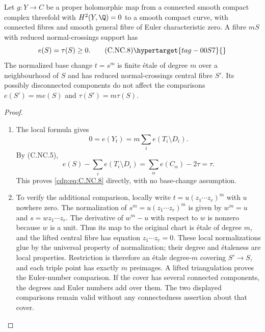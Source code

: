 \begin{proposition}\hypertarget{tag-01CA}{}\label{cdp:st:C.2.NC.3}

Let $g:Y\to C$ be a proper holomorphic map from a connected smooth compact complex threefold with $H^2(Y,\Q)=0$ to a smooth compact curve, with connected fibres and smooth general fibre of Euler characteristic zero. A fibre $mS$ with reduced normal-crossings support has
\[
 e(S)=\tau(S)\ge0.
 \tag{C.NC.8}\hypertarget{tag-00S7}{}\label{cdp:eq:C.NC.8}
\]
The normalized base change $t=s^m$ is finite étale of degree $m$ over a neighbourhood of $S$ and has reduced normal-crossings central fibre $S'$. Its possibly disconnected components do not affect the comparisons
$e(S')=m e(S)$ and $\tau(S')=m\tau(S)$.
\end{proposition}


\begin{proof}

\begin{enumerate}[label={$\langle1\rangle$\arabic*.},leftmargin=*]
\item The local formula  gives
\[
 0=e(Y_t)=m\sum_i e(T_i\setminus D_i).
\]
By (C.NC.5),
\[
 e(S)-\sum_i e(T_i\setminus D_i)
 =\sum_\alpha e(C_\alpha)-2\tau=\tau.
\]
This proves \eqref{cdp:eq:C.NC.8} directly, with no base-change assumption.

\item To verify the additional comparison, locally write $t=u(z_1\cdots z_r)^m$ with $u$ nowhere zero. The normalization of $s^m=u(z_1\cdots z_r)^m$ is given by
$w^m=u$ and $s=wz_1\cdots z_r$.
The derivative of $w^m-u$ with respect to $w$ is nonzero because $w$ is a unit. Thus its map to the original chart is étale of degree $m$, and the lifted central fibre has equation $z_1\cdots z_r=0$. These local normalizations glue by the universal property of normalization; their degree and étaleness are local properties. Restriction is therefore an étale degree-$m$ covering $S'\to S$, and each triple point has exactly $m$ preimages. A lifted triangulation proves the Euler-number comparison. If the cover has several connected components, the degrees and Euler numbers add over them. The two displayed comparisons remain valid without any connectedness assertion about that cover.

\end{enumerate}
\end{proof}